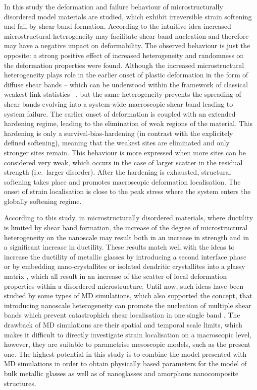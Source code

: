 In this study the deformation and failure behaviour of  microstructurally disordered model materials are studied, which exhibit irreversible strain softening and fail by shear band formation. According to the intuitive idea increased microstructural heterogeneity may facilitate shear band nucleation and therefore may have a negative impact on deformability. The observed behaviour is just the opposite: a strong positive effect of increased heterogeneity and randomness on the deformation properties were found. Although the increased microstructural heterogeneity plays role in the earlier onset of plastic deformation in the form of diffuse shear bands -- which can be understood within the framework of classical weakest-link statistics \cite{ISPANOVITY20136234} --, but the same heterogeneity prevents the spreading of shear bands evolving into a system-wide macroscopic shear band leading to system failure. The earlier onset of deformation is coupled with an extended hardening regime, leading to the elimination of weak regions of the material. This hardening is only a survival-bias-hardening (in contrast with the explicitely defined softening), meaning that the weakest sites are eliminated and only stronger sites remain. This behaviour is more expressed when more sites can be considered very weak, which occurs in the case of larger scatter in the residual strength (i.e.\ larger disorder). After the hardening is exhausted, structural softening takes place and promotes macroscopic deformation localisation. The onset of strain localisation is close to the peak stress where the system enters the globally softening regime.

According to this study, in microstructurally disordered materials, where ductility is limited by shear band formation, the increase of the degree of microstructural heterogeneity on the nanoscale may result both in an increase in strength and in a significant increase in ductility. These results match well with the ideas to increase the ductility of metallic glasses by introducing a second interface phase \cite{adibi2013transition} or by embedding nano-crystallites or isolated dendritic crystallites into a glassy matrix \cite{das2005work,hofmann2008designing}, which all result in an increase of the scatter of local deformation properties within a disordered microstructure. Until now, such ideas have been studied by some types of MD simulations, which also supported the concept, that introducing nanoscale heterogeneity can promote the nucleation of multiple shear bands which prevent catastrophich shear localisation in one single band \cite{PhysRevB.83.100202,PhysRevB.83.100202}. The drawback of MD simulations are their spatial and temporal scale limits, which makes it difficult to directly investigate strain localisation on a macroscopic level, however, they are suitable to parametrise mesoscopic models\cite{rodney2009distribution,rodney2011modeling,albaret2016mapping}, such as the present one. The highest potential in this study is to combine the model presented with MD simulations in order to obtain physically based parameters for the model of bulk metallic glasses as well as of nanoglasses and amorphous nanocomposite structures.


